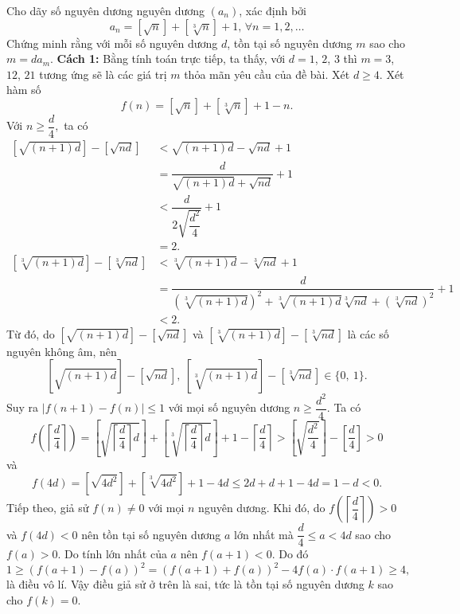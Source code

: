 \begin{bt}%
Cho dãy số nguyên dương nguyên dương $(a_n)$, xác định bởi $$a_n=\left[\sqrt{n}\right]+\left[\sqrt[3]{n}\right]+1, \, \forall n=1,2,\dots $$ Chứng minh rằng với mỗi số nguyên dương $d$, tồn tại số nguyên dương $m$ sao cho $m=da_m$.
	\loigiai
	{\textbf{Cách 1:} Bằng tính toán trực tiếp, ta thấy, với $d=1$, $2$, $3$ thì $m=3$, $12$, $21$ tương ứng sẽ là các giá trị $m$ thỏa mãn yêu cầu của đề bài.
Xét $d\geq 4$.
Xét hàm số 
$$f(n)=\left[\sqrt{n}\right]+\left[\sqrt[3]{n}\right]+1 -n.$$
Với $n \geq \dfrac{d}{4},$ ta có
{\allowdisplaybreaks
	\begin{align*}
\left[\sqrt{(n+1)d}\right]-\left[ \sqrt{nd} \right]&<\sqrt{(n+1)d}-\sqrt{nd}+1 \\&= \dfrac{d}{\sqrt{(n+1)d}+\sqrt{nd}}+1\\
&<\dfrac{d}{2\sqrt{\dfrac{d^2}{4}}}+1\\
&=2. \\
\left[\sqrt[3]{(n+1)d}\right]-\left[ \sqrt[3]{nd} \right]&<\sqrt[3]{(n+1)d}-\sqrt[3]{nd}+1 \\&= \dfrac{d}{\left(\sqrt[3]{(n+1)d}\right)^2+\sqrt[3]{(n+1)d}\sqrt[3]{nd}+\left(\sqrt[3]{nd}\right)^2}+1\\
&<2.\end{align*}}Từ đó, do 
$\left[\sqrt{(n+1)d}\right]-\left[ \sqrt{nd} \right]$ và $\left[\sqrt[3]{(n+1)d}\right]-\left[ \sqrt[3]{nd} \right]$ là các số nguyên không âm, nên
$$\left[\sqrt{(n+1)d}\right]-\left[ \sqrt{nd} \right],\ \left[\sqrt[3]{(n+1)d}\right]-\left[ \sqrt[3]{nd} \right] \in \{0,\ 1\}.$$
Suy ra $\left|f(n+1)-f(n)\right| \leq 1$ với mọi số nguyên dương $n\geq \dfrac{d^2}{4}.$
Ta có 
$$f\left(\left\lceil {\dfrac{d}{4}}\right\rceil \right)=\left[{\sqrt{{\left\lceil {\dfrac{d}{4}}\right\rceil d}}}\right]+\left[{\sqrt[3]{{\left\lceil {\dfrac{d}4}\right\rceil d}}}\right]+1-\left\lceil {\dfrac{d}4}\right\rceil >\left[{\sqrt{{\dfrac{d^2}4}}}\right]-\left[{\dfrac{d}4}\right]>0$$
và $$f(4d)=\left[\sqrt{4d^2}\right]+\left[\sqrt[3]{4d^2}\right]+1-4d\leq 2d+d+1-4d=1-d<0.$$
Tiếp theo, giả sử $f(n) \neq 0$ với mọi $n$ nguyên dương. Khi đó, do $f\left(\left\lceil {\dfrac{d}{4}}\right\rceil  \right)>0$  và $f(4d)<0$ nên tồn tại số nguyên dương $a$ lớn nhất mà $\dfrac{d}{4} \leq a<4d$ sao cho $f(a)>0.$
Do tính lớn nhất của $a$ nên $f(a+1)<0.$ Do đó
$$1\geq \left(f(a+1)-f(a) \right)^2=\left(f(a+1)+f(a) \right)^2-4f(a)\cdot f(a+1) \geq 4,$$ là điều vô lí.
Vậy điều giả sử ở trên là sai, tức là tồn tại số nguyên dương $k$ sao cho $f(k)=0.$
}
\end{bt}
